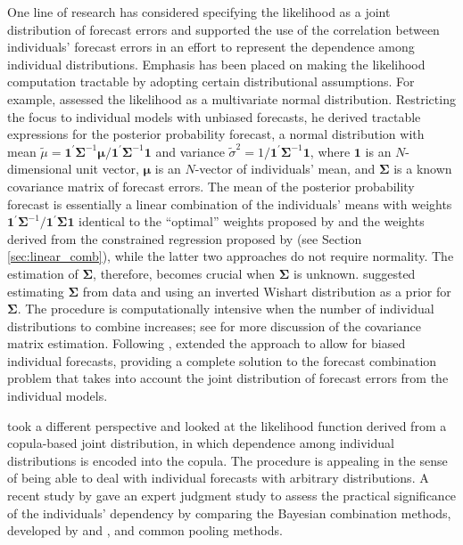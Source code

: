 \documentclass[11pt]{article}
\begin{document}
One line of research has considered specifying the likelihood as a joint distribution of forecast errors and supported the use of the correlation between individuals' forecast errors in an effort to represent the dependence among individual distributions. Emphasis has been placed on making the likelihood computation tractable by adopting certain distributional assumptions. For example, \citet{Winkler1981-bn} assessed the likelihood as a multivariate normal distribution. Restricting the focus to individual models with unbiased forecasts, he derived tractable expressions for the posterior probability forecast, a normal distribution with mean $\tilde{\mu} = \boldsymbol{1}^{\prime} \boldsymbol{\Sigma}^{-1} \boldsymbol{\mu} / \boldsymbol{1}^{\prime} \boldsymbol{\Sigma}^{-1} \boldsymbol{1}$ and variance $\tilde{\sigma}^{2} = 1/\boldsymbol{1}^{\prime} \boldsymbol{\Sigma}^{-1} \boldsymbol{1}$, where $\boldsymbol{1}$ is an $N$-dimensional unit vector, $\boldsymbol{\mu}$ is an $N$-vector of individuals' mean, and $\boldsymbol{\Sigma}$ is a known covariance matrix of forecast errors. The mean of the posterior probability forecast is essentially a linear combination of the individuals' means with weights $\boldsymbol{1}^{\prime} \boldsymbol{\Sigma}^{-1} / \boldsymbol{1}^{\prime} \boldsymbol{\Sigma} \boldsymbol{1}$ identical to the ``optimal'' weights proposed by \citet{Bates1969-yj} and the weights derived from the constrained regression proposed by \citet{Granger1984-jc} (see Section \ref{sec:linear_comb}), while the latter two approaches do not require normality. The estimation of $\boldsymbol{\Sigma}$, therefore, becomes crucial when $\boldsymbol{\Sigma}$ is unknown. \citet{Winkler1981-bn} suggested estimating $\boldsymbol{\Sigma}$ from data and using an inverted Wishart distribution as a prior for $\boldsymbol{\Sigma}$. The procedure is computationally intensive when the number of individual distributions to combine increases; see \citet{Hall2004-tm} for more discussion of the covariance matrix estimation. Following \citet{Winkler1981-bn}, \citet{Palm1992-im} extended the approach to allow for biased individual forecasts, providing a complete solution to the forecast combination problem that takes into account the joint distribution of forecast errors from the individual models.

\citet{Jouini1996-fe} took a different perspective and looked at the likelihood function derived from a copula-based joint distribution, in which dependence among individual distributions is encoded into the copula. The procedure is appealing in the sense of being able to deal with individual forecasts with arbitrary distributions. A recent study by \citet{Wilson2017-ct} gave an expert judgment study to assess the practical significance of the individuals' dependency by comparing the Bayesian combination methods, developed by \citet{Winkler1981-bn} and \citet{Jouini1996-fe}, and common pooling methods.
\end{document}
